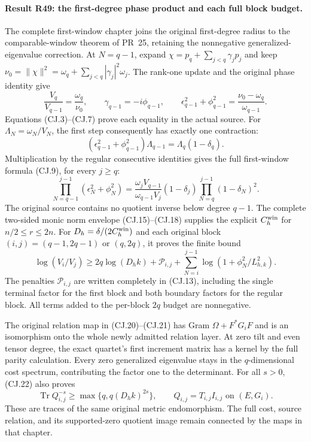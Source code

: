 \paragraph{Result R49: the first-degree phase product and each full block budget.}
The complete first-window chapter joins the original first-degree
radius to the comparable-window theorem of PR~25, retaining the
nonnegative generalized-eigenvalue correction. At $N=q-1$, expand
$\chi=p_q+\sum_{j<q}\gamma_jp_j$ and keep
$\nu_0=\|\chi\|^2=\omega_q+\sum_{j<q}|\gamma_j|^2\omega_j$.
The rank-one update and the original phase identity give
\[
 \frac{V_q}{V_{q-1}}=\frac{\omega_q}{\nu_0},\qquad
 \gamma_{q-1}=-i\phi_{q-1},\qquad
 \epsilon_{q-1}^2+\phi_{q-1}^2
       =\frac{\nu_0-\omega_q}{\omega_{q-1}}.
\]
Equations (CJ.3)--(CJ.7) prove each equality in the actual source.
For $\Lambda_N=\omega_N/V_N$, the first step consequently has
exactly one contraction:
\[
 (\epsilon_{q-1}^2+\phi_{q-1}^2)\Lambda_{q-1}
       =\Lambda_q(1-\delta_q).
\]
Multiplication by the regular consecutive identities gives the full
first-window formula (CJ.9), for every $j\ge q$:
\[
 \prod_{N=q-1}^{j-1}(\epsilon_N^2+\phi_N^2)
 =\frac{\omega_jV_{q-1}}{\omega_{q-1}V_j}
       (1-\delta_j)\prod_{N=q}^{j-1}(1-\delta_N)^2.
\]
The original source contains no quotient inverse below degree $q-1$.
The complete two-sided monic norm envelope (CJ.15)--(CJ.18)
supplies the explicit $C_h^{\rm win}$ for $n/2\le r\le2n$.
For $D_h=\delta/(2C_h^{\rm win})$ and each original block
$(i,j)=(q-1,2q-1)$ or $(q,2q)$, it proves the finite bound
\[
 \log(V_i/V_j)\ge2q\log(D_hk)+\mathcal P_{i,j}
      +\sum_{N=i}^{j-1}\log(1+\phi_N^2/L_{h,k}^2).
\]
The penalties $\mathcal P_{i,j}$ are written completely in (CJ.13),
including the single terminal factor for the first block and both
boundary factors for the regular block. All terms added to the
per-block $2q$ budget are nonnegative.

The original relation map in (CJ.20)--(CJ.21) has Gram
$\Omega+F^*G_iF$ and is an isomorphism onto the whole newly
admitted relation layer. At zero tilt and even tensor degree,
the exact quartet's first increment matrix has a kernel by the
full parity calculation. Every zero generalized eigenvalue stays
in the $q$-dimensional cost spectrum, contributing the factor one
to the determinant. For all $s>0$, (CJ.22) also proves
\[
 \operatorname{Tr}Q_{i,j}^{-s}
       \ge\max\{q,q(D_hk)^{2s}\},
 \qquad Q_{i,j}=T_{i,j}I_{i,j}\text{ on }(E,G_i).
\]
These are traces of the same original metric endomorphism. The
full cost, source relation, and its supported-zero quotient image
remain connected by the maps in that chapter.
